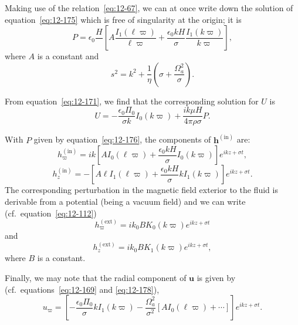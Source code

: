 Making use of the relation~\eqref{eq:12-67}, we can at once write down the solution of equation~\eqref{eq:12-175} which is free of singularity at the origin; it is
\begin{equation}
\label{eq:12-176}
P = \epsilon_0 \frac{H}{} \left[A \frac{I_1(\ell\varpi)}{\ell\varpi} + \frac{\epsilon_0 kH}{\sigma} \frac{I_1(k\varpi)}{k\varpi}\right],
\end{equation}
where $A$ is a constant and
\begin{equation}
\label{eq:12-177}
s^2 = k^2 + \frac{1}{\eta}\left(\sigma + \frac{\Omega_a^2}{\sigma}\right).
\end{equation}

From equation~\eqref{eq:12-171}, we find that the corresponding solution for $U$ is
\begin{equation}
\label{eq:12-178}
U = -\frac{\epsilon_0\Pi_0}{\sigma k}I_0(k\varpi) + \frac{ik\mu H}{4\pi\rho\sigma}P.
\end{equation}

With $P$ given by equation~\eqref{eq:12-176}, the components of $\mathbf{h}^{(\mathrm{in})}$ are:
\begin{equation}
\label{eq:12-179}
h_\varpi^{(\mathrm{in})} = ik\left[A I_0(\ell\varpi) + \frac{\epsilon_0 kH}{\sigma}I_0(k\varpi)\right]e^{ikz+\sigma t},
\end{equation}
\begin{equation}
\label{eq:12-180}
h_z^{(\mathrm{in})} = -\left[A\ell I_1(\ell\varpi) + \frac{\epsilon_0 kH}{\sigma}k I_1(k\varpi)\right]e^{ikz+\sigma t}.
\end{equation}
The corresponding perturbation in the magnetic field exterior to the fluid is derivable from a potential (being a vacuum field) and we can write (cf.\ equation~\eqref{eq:12-112})
\begin{equation}
\label{eq:12-181}
h_\varpi^{(\mathrm{ext})} = ik_0 BK_0(k\varpi)e^{ikz+\sigma t}
\end{equation}
and
\begin{equation}
\label{eq:12-182}
h_z^{(\mathrm{ext})} = ik_0 BK_1(k\varpi)e^{ikz+\sigma t},
\end{equation}
where $B$ is a constant.

Finally, we may note that the radial component of $\mathbf{u}$ is given by (cf.\ equations~\eqref{eq:12-169} and \eqref{eq:12-178}),
\begin{equation}
\label{eq:12-183}
u_\varpi = \left[-\frac{\epsilon_0\Pi_0}{\sigma}k I_1(k\varpi) - \frac{\Omega_a^2}{\sigma^2}[AI_0(\ell\varpi) + \cdots]\right]e^{ikz+\sigma t}.
\end{equation}

